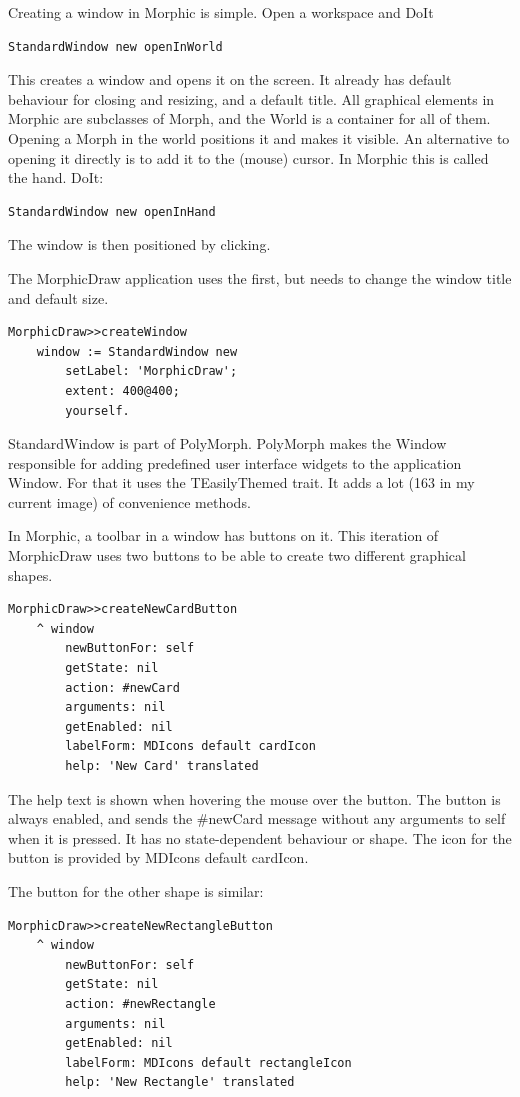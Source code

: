 \documentclass[10pt]{article}   	%
\begin{document}
Creating a window in Morphic is simple. Open a workspace and DoIt
\begin{verbatim}
StandardWindow new openInWorld 
\end{verbatim} 
This creates a window and opens it on the screen. 
It already has default behaviour for closing and resizing, and a default title. 
All graphical elements in Morphic are subclasses of Morph, and the 
World is a container for all of them. Opening a Morph in the world
positions it and makes it visible. An alternative to opening it directly is
to add it to the (mouse) cursor. In Morphic this is called the hand.
DoIt:
\begin{verbatim}
StandardWindow new openInHand 
\end{verbatim} 
The window is then positioned by clicking.

The MorphicDraw application uses the first, but needs to change 
the window title and default size.

\begin{verbatim}
MorphicDraw>>createWindow
    window := StandardWindow new
        setLabel: 'MorphicDraw';
        extent: 400@400;
        yourself.
\end{verbatim}

StandardWindow is part of PolyMorph. PolyMorph makes the 
Window responsible for adding predefined user interface widgets
to the application Window. For that it uses the TEasilyThemed 
trait. It adds a lot (163 in my current image) of convenience methods.

In Morphic, a toolbar in a window has buttons on it. This iteration of
MorphicDraw uses two buttons to be able to create two different 
graphical shapes.

\begin{verbatim}
MorphicDraw>>createNewCardButton
    ^ window
        newButtonFor: self
        getState: nil
        action: #newCard
        arguments: nil
        getEnabled: nil
        labelForm: MDIcons default cardIcon
        help: 'New Card' translated
\end{verbatim}
The help text is shown when hovering the mouse over the button.
The button is always enabled, and sends the \#newCard message 
without any arguments to self when it is pressed. It has no 
state-dependent behaviour or shape. The icon for the button
is provided by MDIcons default cardIcon.

The button for the other shape is similar:
\begin{verbatim}
MorphicDraw>>createNewRectangleButton
    ^ window
        newButtonFor: self
        getState: nil
        action: #newRectangle
        arguments: nil
        getEnabled: nil
        labelForm: MDIcons default rectangleIcon
        help: 'New Rectangle' translated
\end{verbatim}
\end{document}
